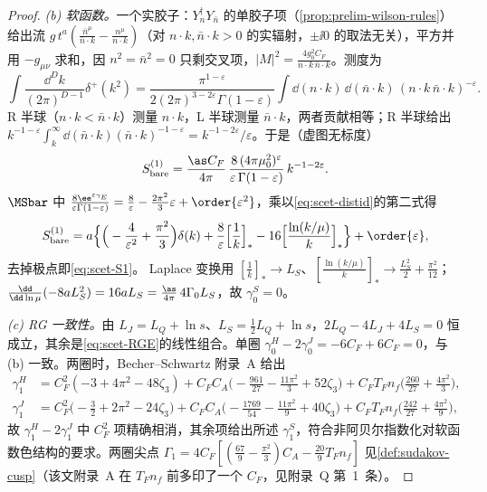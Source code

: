 \begin{proof}
\emph{(b) 软函数。}一个实胶子：$Y_n^\dagger Y_{\bar n}$ 的单胶子项（\cref{prop:prelim-wilson-rules}）给出流 $g\,t^a(\frac{\bar n^\mu}{\bar n\cdot k}-\frac{n^\mu}{n\cdot k})$（对 $n\cdot k,\bar n\cdot k>0$ 的实辐射，$\pm\ii0$ 的取法无关），平方并用 $-g_{\mu\nu}$ 求和，因 $n^2=\bar n^2=0$ 只剩交叉项，$|M|^2=\frac{4g_0^2C_F}{n\cdot k\,\bar n\cdot k}$。测度为
\[
\int\frac{\dd^Dk}{(2\pi)^{D-1}}\delta^+(k^2)=\frac{\pi^{1-\varepsilon}}{2(2\pi)^{3-2\varepsilon}\Gamma(1-\varepsilon)}\int\dd(n\cdot k)\,\dd(\bar n\cdot k)\,(n\cdot k\,\bar n\cdot k)^{-\varepsilon}.
\]
R 半球（$n\cdot k<\bar n\cdot k$）测量 $n\cdot k$，L 半球测量 $\bar n\cdot k$，两者贡献相等；R 半球给出 $k^{-1-\varepsilon}\int_k^\infty\dd(\bar n\cdot k)(\bar n\cdot k)^{-1-\varepsilon}=k^{-1-2\varepsilon}/\varepsilon$。于是（虚图无标度）
\[
S^{(1)}_{\rm bare}=\frac{\as C_F}{4\pi}\,\frac{8\,(4\pi\mu_0^2)^\varepsilon}{\varepsilon\,\Gamma(1-\varepsilon)}\,k^{-1-2\varepsilon}.
\]
$\MSbar$ 中 $\frac{8\ee^{\varepsilon\gamma_E}}{\varepsilon\Gamma(1-\varepsilon)}=\frac8\varepsilon-\frac{2\pi^2}{3}\varepsilon+\order{\varepsilon^2}$，乘以\cref{eq:scet-distid}的第二式得
\[
S^{(1)}_{\rm bare}=a\Big\{\Big(-\frac4{\varepsilon^2}+\frac{\pi^2}3\Big)\delta(k)+\frac8\varepsilon\Big[\frac1k\Big]_*-16\Big[\frac{\ln(k/\mu)}{k}\Big]_*\Big\}+\order{\varepsilon},
\]
去掉极点即\cref{eq:scet-S1}。%
Laplace 变换用 $[\frac1k]_*\to L_S$、$[\frac{\ln(k/\mu)}k]_*\to\frac{L_S^2}2+\frac{\pi^2}{12}$；$\frac{\dd}{\dd\ln\mu}(-8aL_S^2)=16aL_S=\frac{\as}{4\pi}\,4\Gamma_0L_S$，故 $\gamma^S_0=0$。

\emph{(c) RG 一致性。}由 $L_J=L_Q+\ln s$、$L_S=\frac12L_Q+\ln s$，$2L_Q-4L_J+4L_S=0$ 恒成立，其余是\cref{eq:scet-RGE}的线性组合。单圈 $\gamma^H_0-2\gamma^J_0=-6C_F+6C_F=0$，与 (b) 一致。两圈时，Becher--Schwartz 附录~A 给出\cite{BecherSchwartz2008}
\[
\begin{aligned}
\gamma^H_1&=C_F^2(-3+4\pi^2-48\zeta_3)+C_FC_A\Big(-\frac{961}{27}-\frac{11\pi^2}{3}+52\zeta_3\Big)+C_FT_Fn_f\Big(\frac{260}{27}+\frac{4\pi^2}{3}\Big),\\
\gamma^J_1&=C_F^2\Big(-\frac32+2\pi^2-24\zeta_3\Big)+C_FC_A\Big(-\frac{1769}{54}-\frac{11\pi^2}{9}+40\zeta_3\Big)+C_FT_Fn_f\Big(\frac{242}{27}+\frac{4\pi^2}{9}\Big),
\end{aligned}
\]
故 $\gamma^H_1-2\gamma^J_1$ 中 $C_F^2$ 项精确相消，其余项给出所述 $\gamma^S_1$，符合非阿贝尔指数化对软函数色结构的要求。两圈尖点 $\Gamma_1=4C_F[(\frac{67}9-\frac{\pi^2}3)C_A-\frac{20}9T_Fn_f]$ 见\cref{def:sudakov-cusp}（该文附录~A 在 $T_Fn_f$ 前多印了一个 $C_F$，见附录~Q 第~1~条）。%


\end{proof}
